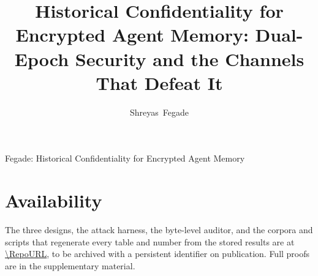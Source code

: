 \documentclass[10pt,journal,compsoc]{IEEEtran}
\theoremstyle{plain}
\theoremstyle{definition}
\begin{document}

\title{Historical Confidentiality for Encrypted Agent Memory: Dual-Epoch Security and the Channels
That Defeat It}

\author{Shreyas~Fegade%
}

%
{Fegade: Historical Confidentiality for Encrypted Agent Memory}


\maketitle
\IEEEdisplaynontitleabstractindextext
\IEEEpeerreviewmaketitle











\section*{Availability}
The three designs, the attack harness, the byte-level auditor, and the corpora and scripts that
regenerate every table and number from the stored results are at
\url{\RepoURL}, to be archived with a persistent identifier on
publication. Full proofs are in the supplementary material.






\vfill
\end{document}
